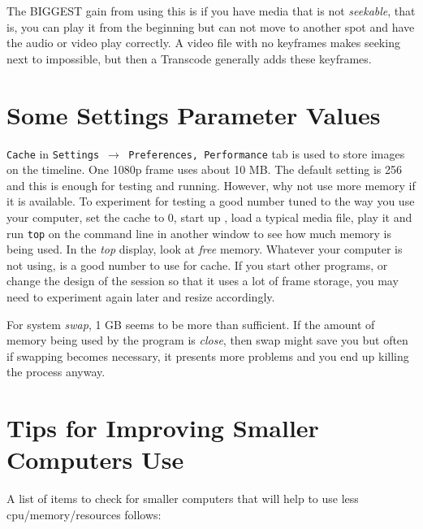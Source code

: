 The BIGGEST gain from using this is if you have media that is not \textit{seekable}, that is, you can play it from the beginning but can not move to another spot and have the audio or video play correctly. A video file with no keyframes makes seeking next to impossible, but then a Transcode generally adds these keyframes. 

\section{Some Settings Parameter Values}%
\label{sec:settings_parameter_values}

\texttt{Cache} in \texttt{Settings $\rightarrow$ Preferences, Performance} tab is used to store images on the timeline.  One 1080p frame uses about 10 MB.  The default setting is 256 and this is enough for testing and running.  However, why not use more memory if it is available.   To experiment for testing a good number tuned to the way you use your computer, set the cache to 0, start up \CGG{}, load a typical media file, play it and run \texttt{top} on the command line in another window to see how much memory is being used.  In the \textit{top} display, look at \textit{free} memory.  Whatever your computer is not using, is a good number to use for cache.  If you start other programs, or change the design of the session so that it uses a lot of frame storage, you may need to experiment again later and resize accordingly.

For system \textit{swap}, 1 GB seems to be more than sufficient.  If the amount of memory being used by the program is \textit{close}, then swap might save you but often if swapping becomes necessary, it presents more problems and you end up killing the \CGG{} process anyway.

\section{Tips for Improving Smaller Computers Use}%
\label{sec:tips_improving_smaller_computers}

A list of items to check for smaller computers that will help to use less cpu/memory/resources follows:


